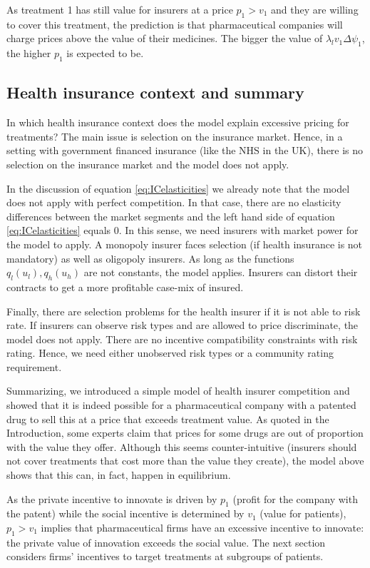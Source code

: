 \documentclass[a4paper,12pt]{article}
\begin{document}
As treatment 1 has still value for insurers at a price \(p_1 > v_1\) and they are willing to cover this treatment, the prediction is that pharmaceutical companies will charge prices above the value of their medicines. The bigger the value of \(\lambda_l v_1 \Delta \psi_1\), the higher \(p_1\) is expected to be.

\subsection{Health insurance context and summary}
\label{sec:orgd128b60}

In which health insurance context does the model explain excessive pricing for treatments? The main issue is selection on the insurance market. Hence, in a setting with government financed insurance (like the NHS in the UK), there is no selection on the insurance market and the model does not apply.

In the discussion of equation \eqref{eq:ICelasticities} we already note that the model does not apply with perfect competition. In that case, there are no elasticity differences between the market segments and the left hand side of equation \eqref{eq:ICelasticities} equals 0. In this sense, we need insurers with market power for the model to apply. A monopoly insurer faces selection (if health insurance is not mandatory) as well as oligopoly insurers. As long as the functions \(q_l(u_l),q_h(u_h)\) are not constants, the model applies. Insurers can distort their contracts to get a more profitable case-mix of insured. 

Finally, there are selection problems for the health insurer if it is not able to risk rate. If insurers can observe risk types and are allowed to price discriminate, the model does not apply. There are no incentive compatibility constraints with risk rating. Hence, we need either unobserved risk types or a community rating requirement. 

Summarizing, we introduced a simple model of health insurer competition and showed that it is indeed possible for a pharmaceutical company with a patented drug to sell this at a price that exceeds treatment value. As quoted in the Introduction, some experts claim that prices for some drugs are out of proportion with the value they offer. Although this seems counter-intuitive (insurers should not cover treatments that cost more than the value they create), the model above shows that this can, in fact, happen in equilibrium.

As the private incentive to innovate is driven by \(p_1\) (profit for the company with the patent) while the social incentive is determined by \(v_1\) (value for patients), \(p_1>v_1\) implies that pharmaceutical firms have an excessive incentive to innovate: the private value of innovation exceeds the social value. The next section considers firms' incentives to target treatments at subgroups of patients.
\end{document}
